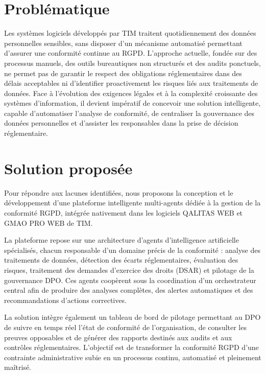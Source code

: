 \documentclass[12pt,a4paper]{report}
\begin{document}
\section{Problématique}

Les systèmes logiciels développés par TIM traitent quotidiennement des données personnelles sensibles, sans disposer d'un mécanisme automatisé permettant d'assurer une conformité continue au RGPD. L'approche actuelle, fondée sur des processus manuels, des outils bureautiques non structurés et des audits ponctuels, ne permet pas de garantir le respect des obligations réglementaires dans des délais acceptables ni d'identifier proactivement les risques liés aux traitements de données. Face à l'évolution des exigences légales et à la complexité croissante des systèmes d'information, il devient impératif de concevoir une solution intelligente, capable d'automatiser l'analyse de conformité, de centraliser la gouvernance des données personnelles et d'assister les responsables dans la prise de décision réglementaire.

\section{Solution proposée}

Pour répondre aux lacunes identifiées, nous proposons la conception et le développement d'une plateforme intelligente multi-agents dédiée à la gestion de la conformité RGPD, intégrée nativement dans les logiciels QALITAS WEB et GMAO PRO WEB de TIM.

La plateforme repose sur une architecture d'agents d'intelligence artificielle spécialisés, chacun responsable d'un domaine précis de la conformité : analyse des traitements de données, détection des écarts réglementaires, évaluation des risques, traitement des demandes d'exercice des droits (DSAR) et pilotage de la gouvernance DPO. Ces agents coopèrent sous la coordination d'un orchestrateur central afin de produire des analyses complètes, des alertes automatiques et des recommandations d'actions correctives.

La solution intègre également un tableau de bord de pilotage permettant au DPO de suivre en temps réel l'état de conformité de l'organisation, de consulter les preuves opposables et de générer des rapports destinés aux audits et aux contrôles réglementaires. L'objectif est de transformer la conformité RGPD d'une contrainte administrative subie en un processus continu, automatisé et pleinement maîtrisé.
\end{document}
